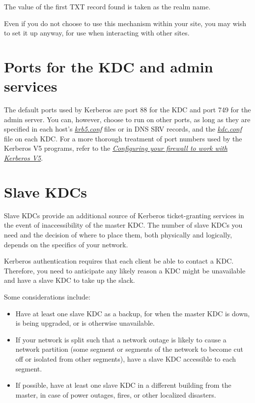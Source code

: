 \documentclass[letterpaper,10pt,english]{sphinxmanual}
\begin{document}
The value of the first TXT record found is taken as the realm name.

Even if you do not choose to use this mechanism within your site,
you may wish to set it up anyway, for use when interacting with other sites.


\section{Ports for the KDC and admin services}
\label{admin/realm_config:ports-for-the-kdc-and-admin-services}
The default ports used by Kerberos are port 88 for the KDC and port
749 for the admin server.  You can, however, choose to run on other
ports, as long as they are specified in each host's
{\hyperref[admin/conf_files/krb5_conf:krb5-conf-5]{\emph{krb5.conf}}} files or in DNS SRV records, and the
{\hyperref[admin/conf_files/kdc_conf:kdc-conf-5]{\emph{kdc.conf}}} file on each KDC.  For a more thorough treatment of
port numbers used by the Kerberos V5 programs, refer to the
{\hyperref[admin/appl_servers:conf-firewall]{\emph{Configuring your firewall to work with Kerberos V5}}}.


\section{Slave KDCs}
\label{admin/realm_config:slave-kdcs}
Slave KDCs provide an additional source of Kerberos ticket-granting
services in the event of inaccessibility of the master KDC.  The
number of slave KDCs you need and the decision of where to place them,
both physically and logically, depends on the specifics of your
network.

Kerberos authentication requires that each client be able to contact a
KDC.  Therefore, you need to anticipate any likely reason a KDC might
be unavailable and have a slave KDC to take up the slack.

Some considerations include:
\begin{itemize}
\item {} 
Have at least one slave KDC as a backup, for when the master KDC is
down, is being upgraded, or is otherwise unavailable.

\item {} 
If your network is split such that a network outage is likely to
cause a network partition (some segment or segments of the network
to become cut off or isolated from other segments), have a slave KDC
accessible to each segment.

\item {} 
If possible, have at least one slave KDC in a different building
from the master, in case of power outages, fires, or other localized
disasters.

\end{itemize}
\end{document}
